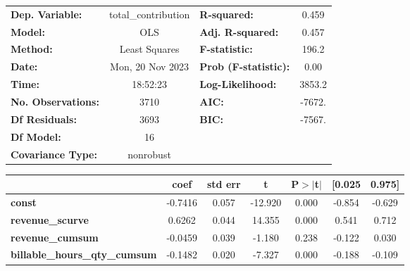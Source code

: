\begin{center}
\begin{tabular}{lclc}
\toprule
\textbf{Dep. Variable:}                  & total\_contribution & \textbf{  R-squared:         } &     0.459   \\
\textbf{Model:}                          &         OLS         & \textbf{  Adj. R-squared:    } &     0.457   \\
\textbf{Method:}                         &    Least Squares    & \textbf{  F-statistic:       } &     196.2   \\
\textbf{Date:}                           &   Mon, 20 Nov 2023  & \textbf{  Prob (F-statistic):} &     0.00    \\
\textbf{Time:}                           &       18:52:23      & \textbf{  Log-Likelihood:    } &    3853.2   \\
\textbf{No. Observations:}               &          3710       & \textbf{  AIC:               } &    -7672.   \\
\textbf{Df Residuals:}                   &          3693       & \textbf{  BIC:               } &    -7567.   \\
\textbf{Df Model:}                       &            16       & \textbf{                     } &             \\
\textbf{Covariance Type:}                &      nonrobust      & \textbf{                     } &             \\
\bottomrule
\end{tabular}
\begin{tabular}{lcccccc}
                                         & \textbf{coef} & \textbf{std err} & \textbf{t} & \textbf{P$> |$t$|$} & \textbf{[0.025} & \textbf{0.975]}  \\
\midrule
\textbf{const}                           &      -0.7416  &        0.057     &   -12.920  &         0.000        &       -0.854    &       -0.629     \\
\textbf{revenue\_scurve}                 &       0.6262  &        0.044     &    14.355  &         0.000        &        0.541    &        0.712     \\
\textbf{revenue\_cumsum}                 &      -0.0459  &        0.039     &    -1.180  &         0.238        &       -0.122    &        0.030     \\
\textbf{billable\_hours\_qty\_cumsum}    &      -0.1482  &        0.020     &    -7.327  &         0.000        &       -0.188    &       -0.109     \\

\end{tabular}
\end{center}
